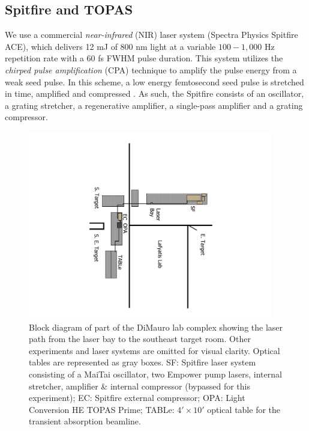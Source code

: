 \subsection{Spitfire and TOPAS}

We use a commercial \textit{near-infrared} (NIR) laser system (Spectra Physics Spitfire ACE), which delivers 12 mJ of 800 nm light at a variable $100 - 1,000$ Hz repetition rate with a 60 fs FWHM pulse duration. This system utilizes the \textit{chirped pulse amplification} (CPA) technique to amplify the pulse energy from a weak seed pulse. In this scheme, a low energy femtosecond seed pulse is stretched in time, amplified and compressed \cite{stricklandCompressionAmplifiedChirped1985}. As such, the Spitfire consists of an oscillator, a grating stretcher, a regenerative amplifier, a single-pass amplifier and a grating compressor.

\begin{figure}
	\centering
	\includegraphics[width=0.95\textwidth,angle=90]{figures/chap2/beam_routing2.pdf}
	\caption{Block diagram of part of the DiMauro lab complex showing the laser path from the laser bay to the southeast target room. Other experiments and laser systems are omitted for visual clarity. Optical tables are represented as gray boxes. SF: Spitfire laser system consisting of a MaiTai oscillator, two Empower pump lasers, internal stretcher, amplifier \& internal compressor (bypassed for this experiment); EC: Spitfire external compressor; OPA: Light Conversion HE TOPAS Prime; TABLe: $4' \times 10'$ optical table for the transient absorption beamline.}
	\label{fig:beam_routing}
\end{figure}

